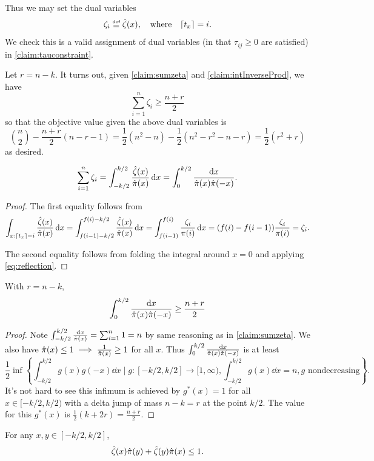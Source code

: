 \documentclass[main.tex]{subfiles}
\begin{document}
Thus we may set the dual variables
\[
\zeta_{i}\defeq\zzeta(x),\quad\text{where}\quad\lceil t_{x}\rceil=i.
\]
We check this is a valid assignment of dual variables (in that $\tau_{ij}\ge0$ are satisfied) in \cref{claim:tauconstraint}. 

Let $r=n-k$. It turns out, given \cref{claim:sumzeta} and \cref{claim:intInverseProd}, we have
\[
\sum_{i=1}^{n}\zeta_{i}\ge\frac{n+r}{2}
\]
so that the objective value given the above dual variables is
\[
\binom{n}{2}-\frac{n+r}{2}(n-r-1)=\frac{1}{2}(n^{2}-n)-\frac{1}{2}(n^{2}-r^{2}-n-r)=\frac{1}{2}(r^{2}+r)
\]
as desired.
\begin{claim}
\label{claim:sumzeta}
\[
\sum_{i=1}^{n}\zeta_{i}=\int_{-k/2}^{k/2}\frac{\hat{\zeta}(x)}{\hat{\pi}(x)}\mathop{}\!\mathrm{d} x=\int_{0}^{k/2}\frac{\mathop{}\!\mathrm{d} x}{\hat{\pi}(x)\hat{\pi}(-x)}.
\]
\end{claim}

\begin{proof}
The first equality follows from 
\[
\int_{x:\lceil t_{x}\rceil=i}\frac{\hat{\zeta}(x)}{\hat{\pi}(x)}\mathop{}\!\mathrm{d} x=\int_{f(i-1)-k/2}^{f(i)-k/2}\frac{\hat{\zeta}(x)}{\hat{\pi}(x)}\mathop{}\!\mathrm{d} x=\int_{f(i-1)}^{f(i)}\frac{\zeta_{i}}{\pi(i)}\mathop{}\!\mathrm{d} x=(f(i)-f(i-1))\frac{\zeta_{i}}{\pi(i)}=\zeta_{i}.
\]

The second equality follows from folding the integral around $x=0$ and applying \cref{eq:reflection}.
\end{proof}
\begin{claim}
\label{claim:intInverseProd}With $r=n-k$,
\[
\int_{0}^{k/2}\frac{\mathop{}\!\mathrm{d} x}{\hat{\pi}(x)\hat{\pi}(-x)}\ge\frac{n+r}{2}
\]
\end{claim}

\begin{proof}
Note $\int_{-k/2}^{k/2}\frac{\mathop{}\!\mathrm{d} x}{\hat{\pi}(x)}=\sum_{i=1}^{n}1=n$ by same reasoning as in \cref{claim:sumzeta}. We also have $\hat{\pi}(x)\le1\implies\frac{1}{\hat{\pi}(x)}\ge1$ for all $x$. Thus $\int_{0}^{k/2}\frac{\mathop{}\!\mathrm{d} x}{\hat{\pi}(x)\hat{\pi}(-x)}$ is at least
\[
\frac{1}{2}\inf\left\{ \int_{-k/2}^{k/2}g(x)g(-x)\dd x\mid g:[-k/2,k/2]\to[1,\infty),\int_{-k/2}^{k/2}g(x)\dd x=n,g\text{ nondecreasing}\right\} .
\]
It's not hard to see this infimum is achieved by $g^{*}(x)=1$ for all $x\in[-k/2,k/2)$ with a delta jump of mass $n-k=r$ at the point $k/2$. The value for this $g^{*}(x)$ is $\frac{1}{2}(k+2r)=\frac{n+r}{2}$.
\end{proof}
\begin{claim}
\label{claim:tauconstraint}For any $x,y\in[-k/2,k/2]$,
\[
\hat{\zeta}(x)\hat{\pi}(y)+\hat{\zeta}(y)\hat{\pi}(x)\le1.
\]
\end{claim}
\end{document}
